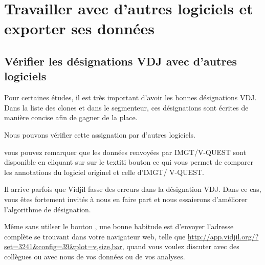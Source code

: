 \documentclass[10pt]{article}
\begin{document}
\section{Travailler avec d'autres logiciels et exporter ses données}

\subsection{Vérifier les désignations VDJ avec d'autres logiciels}

Pour certaines études, il est  très important d'avoir les bonnes désignations VDJ.
Dans la liste des clones et dans le segmenteur, ces désignations sont écrites de manière
concise afin de gagner de la place.


Nous pouvons vérifier cette assignation par d'autres logiciels.

  vous pouvez remarquer que les données renvoyées par IMGT/V-QUEST sont disponible en cliquant sur sur le textit{i} bouton ce qui vous permet de comparer les annotations du logiciel originel et celle d'IMGT/ V-QUEST.       

\bigskip

Il arrive parfois que Vidjil fasse des erreurs dans la désignation VDJ.
Dans ce cas, vous êtes fortement invités à nous en faire part et nous
essaierons d'améliorer l'algorithme de désignation.


Même sans utilser le bouton , une bonne habitude est
d'envoyer l'adresse complète se trouvant dans votre navigateur web,
telle que \url{http://app.vidjil.org/?set=3241&config=39&plot=v,size,bar},
quand vous voulez discuter avec des collègues ou avec nous de vos données
ou de vos analyses.
\end{document}
